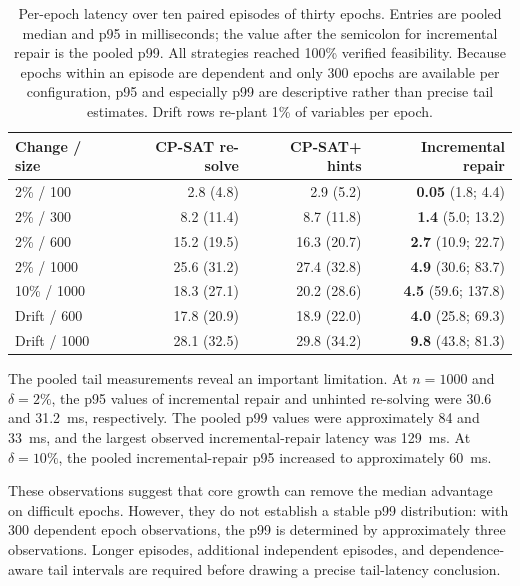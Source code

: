 \documentclass[pdflatex,sn-mathphys-num,iicol,oneside]{sn-jnl}
\newcommand{\cpsat}{\textsc{CP-SAT}\xspace}
\begin{document}
\begin{table}[t]
\centering
\caption{
Per-epoch latency over ten paired episodes of thirty epochs. Entries
are pooled median and p95 in milliseconds; the value after the
semicolon for incremental repair is the pooled p99. All strategies
reached 100\% verified feasibility. Because epochs within an episode
are dependent and only 300 epochs are available per configuration,
p95 and especially p99 are descriptive rather than precise tail
estimates. Drift rows re-plant 1\% of variables per epoch.
}
\label{tab:amortized}
\setlength{\tabcolsep}{6pt}
\small

\begin{tabular}{lrrr}
\toprule
Change / size &
\cpsat re-solve &
\cpsat + hints &
Incremental repair\\
\midrule

2\% / 100
& 2.8 (4.8)
& 2.9 (5.2)
& \textbf{0.05} (1.8; 4.4)\\

2\% / 300
& 8.2 (11.4)
& 8.7 (11.8)
& \textbf{1.4} (5.0; 13.2)\\

2\% / 600
& 15.2 (19.5)
& 16.3 (20.7)
& \textbf{2.7} (10.9; 22.7)\\

2\% / 1000
& 25.6 (31.2)
& 27.4 (32.8)
& \textbf{4.9} (30.6; 83.7)\\

10\% / 1000
& 18.3 (27.1)
& 20.2 (28.6)
& \textbf{4.5} (59.6; 137.8)\\

\midrule

Drift / 600
& 17.8 (20.9)
& 18.9 (22.0)
& \textbf{4.0} (25.8; 69.3)\\

Drift / 1000
& 28.1 (32.5)
& 29.8 (34.2)
& \textbf{9.8} (43.8; 81.3)\\

\bottomrule
\end{tabular}
\normalsize
\end{table}

The pooled tail measurements reveal an important limitation. At
$n=1000$ and $\delta=2\%$, the p95 values of incremental repair and
unhinted re-solving were 30.6 and 31.2~ms, respectively. The pooled
p99 values were approximately 84 and 33~ms, and the largest observed
incremental-repair latency was 129~ms. At $\delta=10\%$, the pooled
incremental-repair p95 increased to approximately 60~ms.

These observations suggest that core growth can remove the median
advantage on difficult epochs. However, they do not establish a
stable p99 distribution: with 300 dependent epoch observations, the
p99 is determined by approximately three observations. Longer
episodes, additional independent episodes, and dependence-aware tail
intervals are required before drawing a precise tail-latency
conclusion.
\end{document}
